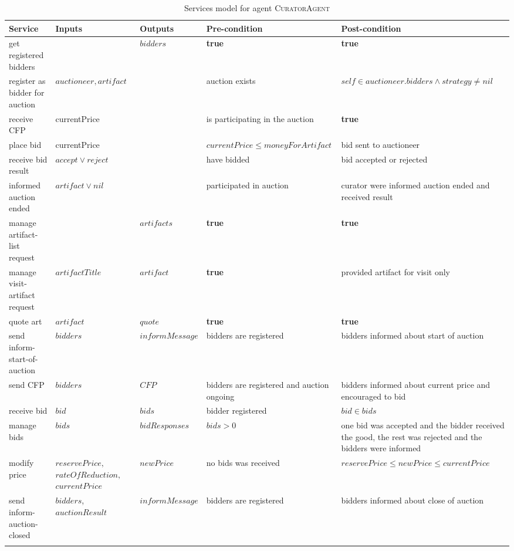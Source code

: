 \documentclass[paper=letter, fontsize=12pt]{article}
\begin{document}
\begin {table}[H]
\caption {Services model for agent \textsc{CuratorAgent}} \label{tab:curatorAgent} 
\begin{center}
    \begin{tabular}{  p{3cm}  p{2.5cm}  p{2.5cm}  p{4cm}  p{4cm} }
\Xhline{4\arrayrulewidth}
    Service & Inputs & Outputs & Pre-condition & Post-condition\\ \hline
get registered bidders & & $bidders$ & \textbf{true} & \textbf{true}\\
register as bidder for auction & $auctioneer, artifact$ & & auction exists & $self \in auctioneer.bidders \land strategy \neq nil$ \\
receive CFP & currentPrice & & is participating in the auction &  \textbf{true}\\
place bid & currentPrice & & $currentPrice \leq moneyForArtifact$ & bid sent to auctioneer\\
receive bid result & $accept \lor reject$ & & have bidded & bid accepted or rejected\\
informed auction ended & $artifact \lor nil$ & & participated in auction & curator were informed auction ended and received result\\
manage artifact-list request & & $artifacts$ & \textbf{true} & \textbf{true}\\
manage visit-artifact request &$artifactTitle$ & $artifact$ & \textbf{true} & provided artifact for visit only\\
quote art &$artifact$ & $quote$ & \textbf{true} & \textbf{true} \\
send inform-start-of-auction &$bidders$ & $informMessage$ & bidders are registered & bidders informed about start of auction \\
send CFP &$bidders$ & $CFP$ & bidders are registered and auction ongoing & bidders informed about current price and encouraged to bid \\
receive bid &$bid$ & $bids$ & bidder registered  & $bid \in bids$ \\
manage bids &$bids$ & $bidResponses$ & $bids > 0$ & one bid was accepted and the bidder received the good, the rest was rejected and the bidders were informed \\
modify price &$reservePrice,$ $rateOfReduction,$ $currentPrice$ & $newPrice$& no bids was received & $reservePrice \leq newPrice \leq currentPrice$ \\
send inform-auction-closed &$bidders$, $auctionResult$ & $informMessage$ & bidders are registered & bidders informed about close of auction \\
\Xhline{4\arrayrulewidth}
    \end{tabular}
\end{center}
\end{table}
\end{document}

